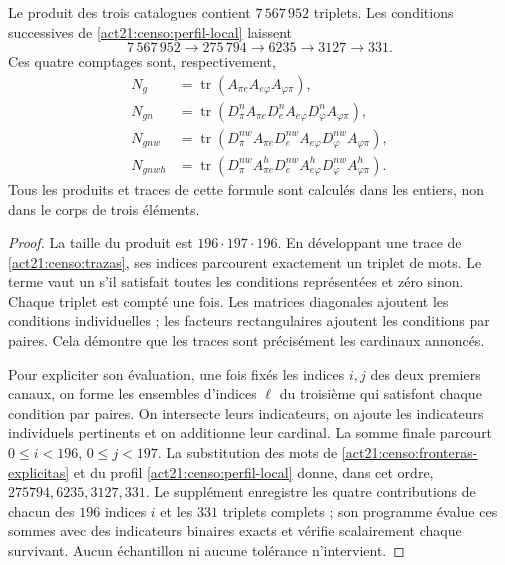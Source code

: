 \begin{samepage}
\begin{theorem}
\label{act21:censo:teorema-conteo}
Le produit des trois catalogues contient \(7\,567\,952\) triplets.
Les conditions successives de \eqref{act21:censo:perfil-local} laissent
\begin{equation}
 7\,567\,952\longrightarrow275\,794\longrightarrow6235
 \longrightarrow3127\longrightarrow331.
 \label{act21:censo:cadena-local}
\end{equation}
Ces quatre comptages sont, respectivement,
\begin{align}
 N_g&=\operatorname{tr}(A_{\pi e}A_{e\varphi}A_{\varphi\pi}),
 \nonumber\\
 N_{gn}&=\operatorname{tr}(D_\pi^n A_{\pi e}
             D_e^n A_{e\varphi}D_\varphi^n A_{\varphi\pi}),
 \nonumber\\
 N_{gnw}&=\operatorname{tr}(D_\pi^{nw} A_{\pi e}
             D_e^{nw} A_{e\varphi}D_\varphi^{nw} A_{\varphi\pi}),
 \nonumber\\
 N_{gnwh}&=\operatorname{tr}(D_\pi^{nw} A^h_{\pi e}
             D_e^{nw} A^h_{e\varphi}D_\varphi^{nw} A^h_{\varphi\pi}).
 \label{act21:censo:trazas}
\end{align}
Tous les produits et traces de cette formule sont calculés dans les entiers,  
non dans le corps de trois éléments.
\end{theorem}
\end{samepage}
\begin{proof}
La taille du produit est \(196\cdot197\cdot196\). En développant
une trace de \eqref{act21:censo:trazas}, ses indices parcourent exactement un
triplet de mots. Le terme vaut un s'il satisfait toutes les conditions
représentées et zéro sinon. Chaque triplet est compté une fois.
Les matrices diagonales ajoutent les conditions individuelles ; les facteurs
rectangulaires ajoutent les conditions par paires. Cela démontre que les
traces sont précisément les cardinaux annoncés.

Pour expliciter son évaluation, une fois fixés les indices \(i,j\) des deux premiers canaux, on forme les ensembles d'indices \(\ell\) du troisième qui satisfont chaque condition par paires. On intersecte leurs indicateurs, on ajoute les indicateurs individuels pertinents et on additionne leur cardinal. La somme finale parcourt \(0\leq i<196\), \(0\leq j<197\). La substitution des mots de \eqref{act21:censo:fronteras-explicitas} et du profil \eqref{act21:censo:perfil-local} donne, dans cet ordre, \(275794,6235,3127,331\). Le supplément enregistre les quatre contributions de chacun des \(196\) indices \(i\) et les \(331\) triplets complets ; son programme évalue ces sommes avec des indicateurs binaires exacts et vérifie scalairement chaque survivant. Aucun échantillon ni aucune tolérance n'intervient.
\end{proof}

